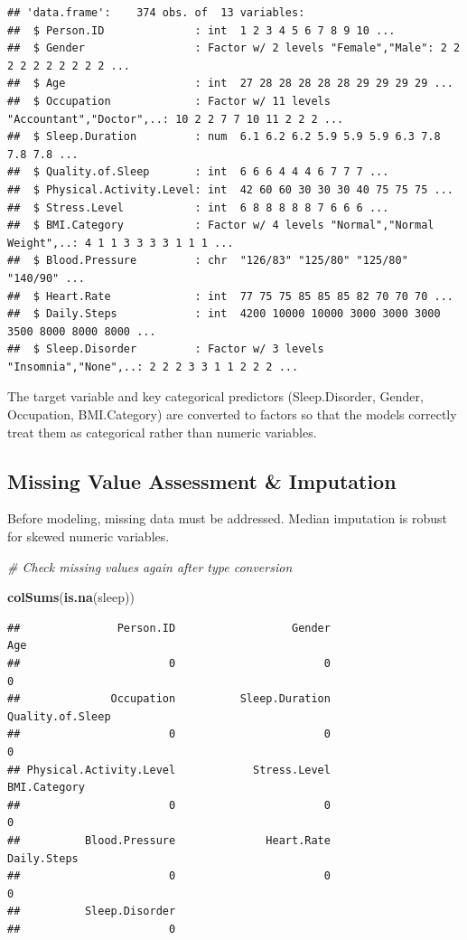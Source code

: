 \documentclass[
]{article}
\newenvironment{Shaded}{\begin{snugshade}}{\end{snugshade}}
\newcommand{\CommentTok}[1]{\textcolor[rgb]{0.56,0.35,0.01}{\textit{#1}}}
\newcommand{\FunctionTok}[1]{\textcolor[rgb]{0.13,0.29,0.53}{\textbf{#1}}}
\newcommand{\NormalTok}[1]{#1}
\begin{document}
\begin{verbatim}
## 'data.frame':    374 obs. of  13 variables:
##  $ Person.ID              : int  1 2 3 4 5 6 7 8 9 10 ...
##  $ Gender                 : Factor w/ 2 levels "Female","Male": 2 2 2 2 2 2 2 2 2 2 ...
##  $ Age                    : int  27 28 28 28 28 28 29 29 29 29 ...
##  $ Occupation             : Factor w/ 11 levels "Accountant","Doctor",..: 10 2 2 7 7 10 11 2 2 2 ...
##  $ Sleep.Duration         : num  6.1 6.2 6.2 5.9 5.9 5.9 6.3 7.8 7.8 7.8 ...
##  $ Quality.of.Sleep       : int  6 6 6 4 4 4 6 7 7 7 ...
##  $ Physical.Activity.Level: int  42 60 60 30 30 30 40 75 75 75 ...
##  $ Stress.Level           : int  6 8 8 8 8 8 7 6 6 6 ...
##  $ BMI.Category           : Factor w/ 4 levels "Normal","Normal Weight",..: 4 1 1 3 3 3 3 1 1 1 ...
##  $ Blood.Pressure         : chr  "126/83" "125/80" "125/80" "140/90" ...
##  $ Heart.Rate             : int  77 75 75 85 85 85 82 70 70 70 ...
##  $ Daily.Steps            : int  4200 10000 10000 3000 3000 3000 3500 8000 8000 8000 ...
##  $ Sleep.Disorder         : Factor w/ 3 levels "Insomnia","None",..: 2 2 2 3 3 1 1 2 2 2 ...
\end{verbatim}

The target variable and key categorical predictors (Sleep.Disorder,
Gender, Occupation, BMI.Category) are converted to factors so that the
models correctly treat them as categorical rather than numeric
variables.

\subsection{Missing Value Assessment \&
Imputation}\label{missing-value-assessment-imputation}

Before modeling, missing data must be addressed. Median imputation is
robust for skewed numeric variables.

\begin{Shaded}
\begin{Highlighting}[]
\CommentTok{\# Check missing values again after type conversion}

\FunctionTok{colSums}\NormalTok{(}\FunctionTok{is.na}\NormalTok{(sleep))}
\end{Highlighting}
\end{Shaded}

\begin{verbatim}
##               Person.ID                  Gender                     Age 
##                       0                       0                       0 
##              Occupation          Sleep.Duration        Quality.of.Sleep 
##                       0                       0                       0 
## Physical.Activity.Level            Stress.Level            BMI.Category 
##                       0                       0                       0 
##          Blood.Pressure              Heart.Rate             Daily.Steps 
##                       0                       0                       0 
##          Sleep.Disorder 
##                       0
\end{verbatim}
\end{document}

